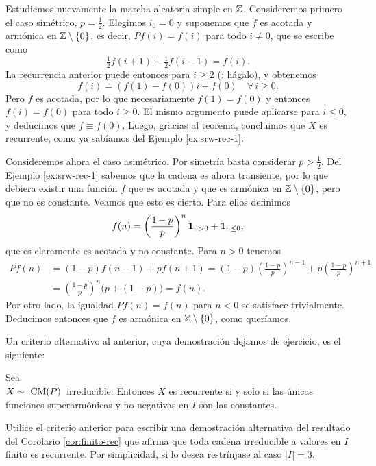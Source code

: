 \begin{ex}\label{ex:srw-rec-2}
Estudiemos nuevamente la marcha aleatoria simple en $\mathbb{Z}$.
Consideremos primero el caso simétrico, $p=\frac12$.
Elegimos $i_0=0$ y suponemos que $f$ es acotada y armónica en $\mathbb{Z}\setminus\{0\}$, es decir, $Pf(i)=f(i)$ para todo $i\neq0$, que se escribe como
\[\tfrac12f(i+1)+\tfrac12f(i-1)=f(i).\]
La recurrencia anterior puede entonces para $i\geq2$ (\uexers: hágalo), y obtenemos
\[f(i)=(f(1)-f(0))i+f(0)\quad\forall\,i\geq0.\]
Pero $f$ es acotada, por lo que necesariamente $f(1)=f(0)$ y entonces $f(i)=f(0)$ para todo $i\geq0$.
El mismo argumento puede aplicarse para $i\leq0$, y deducimos que $f\equiv f(0)$.
Luego, gracias al teorema, concluimos que $X$ es recurrente, como ya sabíamos del Ejemplo \ref{ex:srw-rec-1}.

\noindent Consideremos ahora el caso asimétrico.
Por simetría basta considerar $p>\frac12$.
Del Ejemplo \ref{ex:srw-rec-1} sabemos que la cadena es ahora transiente, por lo que debiera existir una función $f$ que es acotada y que es armónica en $\mathbb{Z}\setminus\{0\}$, pero que no es constante.
Veamos que esto es cierto.
Para ellos definimos
\[f(n)=\left(\frac{1-p}{p}\right)^{n}\mathbf{1}_{n>0}+\mathbf{1}_{n\leq0},\]
que es claramente es acotada y no constante.
Para $n>0$ tenemos
\begin{align}
Pf(n)&=(1-p)f(n-1)+pf(n+1)=(1-p)\left(\frac{1-p}{p}\right)^{n-1}+p\left(\frac{1-p}{p}\right)^{n+1}\\
&=\left(\frac{1-p}{p}\right)^{n}\big(p+(1-p)\big)=f(n).
\end{align}
Por otro lado, la igualdad $Pf(n)=f(n)$ para $n<0$ se satisface trivialmente.
Deducimos entonces que $f$ es armónica en $\mathbb{Z}\setminus\{0\}$, como queríamos.
\end{ex}

Un criterio alternativo al anterior, cuya demostración dejamos de ejercicio, es el siguiente:

\begin{thm}
Sea\\ $X\sim~\text{\upshape{CM}}(P)$~irreducible.
Entonces $X$ es recurrente si y solo si las únicas funciones superarmónicas y no-negativas en $I$ son las constantes.
\end{thm}

\begin{exer}
Utilice el criterio anterior para escribir una demostración alternativa del resultado del Corolario \ref{cor:finito-rec} que afirma que toda cadena irreducible a valores en $I$ finito es recurrente.
Por simplicidad, si lo desea restrínjase al caso $|I|=3$.
\end{exer}

